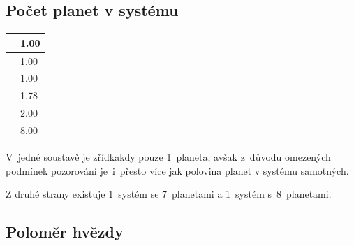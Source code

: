 \documentclass[a4paper,12pt]{article}
\begin{document}
\subsection{Počet planet v systému}

\setlength{\columnsep}{0\textwidth}
\begin{multicols}{2}
\begin{minipage}{0.3\textwidth}
\begin{tabular}{| l| l|}
   \hline
{\cellcolor[rgb]{0.85, 0.85, 0.85}{ Min }} & 1.00 \\ 
   \hline
{\cellcolor[rgb]{0.85, 0.85, 0.85}{ Qu1 }} & 1.00 \\ 
   \hline
{\cellcolor[rgb]{0.85, 0.85, 0.85}{ Median }} & 1.00 \\ 
   \hline
{\cellcolor[rgb]{0.85, 0.85, 0.85}{ Mean }} & 1.78 \\ 
   \hline
{\cellcolor[rgb]{0.85, 0.85, 0.85}{ Qu3 }} & 2.00 \\ 
   \hline
{\cellcolor[rgb]{0.85, 0.85, 0.85}{ Max }} & 8.00 \\ 
   \hline
\end{tabular}\end{minipage}
\begin{minipage}{0.7\textwidth}
V~jedné soustavě je zřídkakdy pouze 1~planeta, avšak z~důvodu omezených podmínek pozorování je~i~přesto více jak polovina planet v systému samotných.

Z druhé strany existuje 1~systém se 7~planetami a 1~systém s~8~planetami.
\end{minipage}
\end{multicols}

\subsection{Poloměr hvězdy}
\end{document}
